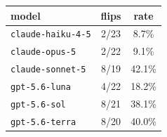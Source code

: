 \begin{tabular}{lcc}
\toprule
model & flips & rate \\
\midrule
\texttt{claude-haiku-4-5} & 2/23 & 8.7\% \\
\texttt{claude-opus-5} & 2/22 & 9.1\% \\
\texttt{claude-sonnet-5} & 8/19 & 42.1\% \\
\texttt{gpt-5.6-luna} & 4/22 & 18.2\% \\
\texttt{gpt-5.6-sol} & 8/21 & 38.1\% \\
\texttt{gpt-5.6-terra} & 8/20 & 40.0\% \\
\bottomrule
\end{tabular}

